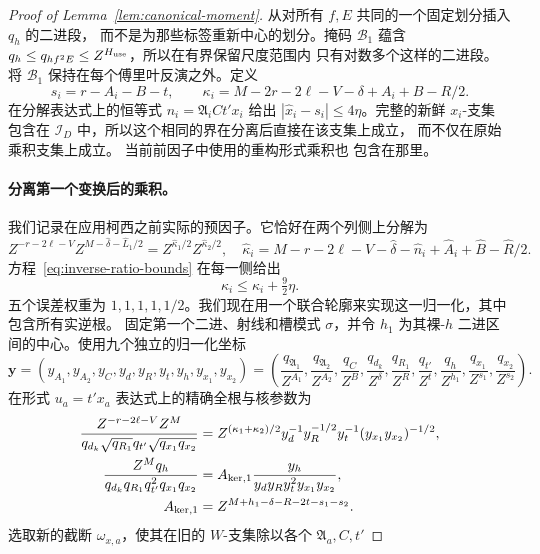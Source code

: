 \documentclass[11pt,a4paper]{article}
\numberwithin{equation}{section}
\numberwithin{figure}{section}
\theoremstyle{definition}
\theoremstyle{remark}
\begin{document}
\begin{proof}[Proof of Lemma~\ref{lem:canonical-moment}]
从对所有 \(f,E\) 共同的一个固定划分插入 \(q_h\) 的二进段，
而不是为那些标签重新中心的划分。掩码 \(\mathcal B_1\)
蕴含 \(q_h\le q_{hf^2E}\le Z^{H_{\rm use}}\)，所以在有界保留尺度范围内
只有对数多个这样的二进段。
将 \(\mathcal B_1\) 保持在每个傅里叶反演之外。定义
\[
 s_i=r-A_i-B-t,\qquad
 \kappa_i=M-2r-2\ell-V-\delta+A_i+B-R/2.
\]
在分解表达式上的恒等式 \(n_i=\mathfrak A_iCt'x_i\)
给出 \(|\widehat x_i-s_i|\le4\eta\)。完整的新鲜 \(x_i\)-支集
包含在 \(\mathcal I_D\) 中，所以这个相同的界在分离后直接在该支集上成立，
而不仅在原始乘积支集上成立。
当前前因子中使用的重构形式乘积也
包含在那里。\paragraph{分离第一个变换后的乘积。}
我们记录在应用柯西之前实际的预因子。它恰好在两个列侧上分解为
\[
 Z^{-r-2\ell-V}Z^{M-\widehat\delta-\widehat L_1/2}
       =Z^{\widehat\kappa_1/2}Z^{\widehat\kappa_2/2},
 \quad
 \widehat\kappa_i=M-r-2\ell-V-\widehat\delta-\widehat n_i
                  +\widehat A_i+\widehat B-\widehat R/2.
\]
方程~\eqref{eq:inverse-ratio-bounds} 在每一侧给出
\begin{equation}\label{eq:inverse-first-prefactor-error}
 \widehat\kappa_i\le\kappa_i+\tfrac92\eta.
\end{equation}
五个误差权重为 \(1,1,1,1,1/2\)。我们现在用一个联合轮廓来实现这一归一化，其中包含所有实逆根。
固定第一个二进、射线和槽模式 \(\sigma\)，并令 \(h_1\)
为其裸-\(h\) 二进区间的中心。使用九个独立的归一化坐标
\[
 \boldsymbol y=(y_{A_1},y_{A_2},y_C,y_d,y_R,y_t,y_h,y_{x_1},y_{x_2})
 =\left(\frac{q_{\mathfrak A_1}}{Z^{A_1}},
 \frac{q_{\mathfrak A_2}}{Z^{A_2}},\frac{q_C}{Z^B},
 \frac{q_{d_k}}{Z^\delta},\frac{q_{R_1}}{Z^R},\frac{q_{t'}}{Z^t},
 \frac{q_h}{Z^{h_1}},\frac{q_{x_1}}{Z^{s_1}},\frac{q_{x_2}}{Z^{s_2}}\right).
\]
在形式 \(u_a=t'x_a\) 表达式上的精确全根与核参数为
\begin{equation}\label{eq:inverse-first-root-kernel}
 \begin{split}
 \frac{Z^{-r-2\ell-V}Z^M}
 {q_{d_k}\sqrt{q_{R_1}}q_{t'}\sqrt{q_{x_1}q_{x_2}}}
 &=Z^{(\kappa_1+\kappa_2)/2}
 y_d^{-1}y_R^{-1/2}y_t^{-1}(y_{x_1}y_{x_2})^{-1/2},\\
 \frac{Z^Mq_h}{q_{d_k}q_{R_1}q_{t'}^2q_{x_1}q_{x_2}}
 &=A_{{\rm ker},1}\frac{y_h}{y_dy_Ry_t^2y_{x_1}y_{x_2}},\\
 A_{{\rm ker},1}&=Z^{M+h_1-\delta-R-2t-s_1-s_2}.
 \end{split}
\end{equation}
选取新的截断 \(\omega_{x,a}\)，使其在旧的
\(W\)-支集除以各个 \(\mathfrak A_a,C,t'\)

\end{proof}
\end{document}
